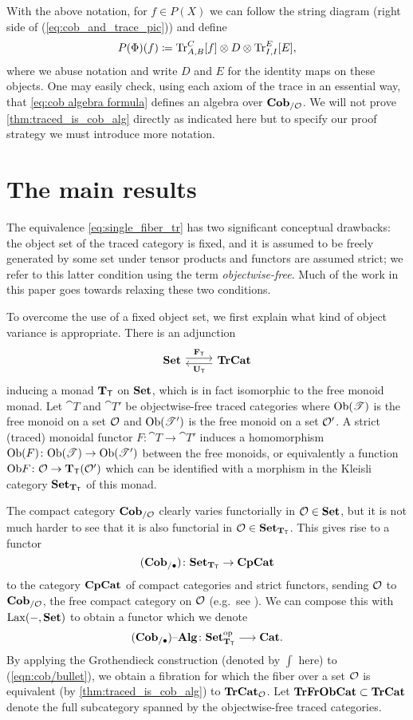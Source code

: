 \documentclass[11pt,oneside,article]{memoir}
\begin{document}
With the above notation, for $f\in P(X)$ we can follow the string diagram (right side of
(\ref{eq:cob_and_trace_pic})) and define
\begin{equation}
    \label{eq:cob algebra formula}
  P(\Phi)(f)\coloneqq\operatorname{Tr}_{A,B}^C[f]\otimes D\otimes\operatorname{Tr}^E_{I,I}[E],
\end{equation}
where we abuse notation and write $D$ and $E$ for the identity maps on these objects. One may easily
check, using each axiom of the trace \cite{JoyalStreetVerity} in an essential way, that
\eqref{eq:cob algebra formula} defines an algebra over $\mathbf{Cob}_{/\mathcal{O}}$. We will not prove
\ref{thm:traced_is_cob_alg} directly as indicated here but to specify our proof strategy we must
introduce more notation.

\section{The main results}
  \label{sec:main_results}

The equivalence \eqref{eq:single_fiber_tr} has two significant conceptual drawbacks: the object set
of the traced category is fixed, and it is assumed to be freely generated by some set under tensor
products and functors are assumed strict; we refer to this latter condition using the term
\emph{objectwise-free}. Much of the work in this paper goes towards relaxing these two conditions.

To overcome the use of a fixed object set, we first explain what kind of object variance is
appropriate. There is an adjunction
\[
  \Adjoint{\Set}{\TrCat}{\FT}{\UT}
\]
inducing a monad $\mathbf{T}_{\mathsf{T}}$ on $\mathbf{Set}$, which is in fact isomorphic to the free monoid monad. Let
$\cat{T}$ and $\cat{T}'$ be objectwise-free traced categories where $\mathrm{Ob}(\mathscr{T})$ is the free
monoid on a set $\mathcal{O}$ and $\mathrm{Ob}(\mathscr{T}')$ is the free monoid on a set $\mathcal{O}'$. A strict
(traced) monoidal functor $F\colon \cat{T}\to \cat{T}'$ induces a homomorphism
$\mathrm{Ob}(F)\colon\mathrm{Ob}(\mathscr{T})\to\mathrm{Ob}(\mathscr{T}')$ between the free monoids, or equivalently a function $\mathrm{Ob}
F\colon\mathcal{O}\to\mathbf{T}_{\mathsf{T}}(\mathcal{O}')$ which can be identified with a morphism in the Kleisli category
$\mathbf{Set}_{\mathbf{T}_{\mathsf{T}}}$ of this monad.

The compact category $\mathbf{Cob}_{/\mathcal{O}}$ clearly varies functorially in $\mathcal{O}\in\mathbf{Set}$, but it is not
much harder to see that it is also functorial in $\mathcal{O}\in\mathbf{Set}_{\mathbf{T}_{\mathsf{T}}}$.  This gives rise to a functor
\[
  (\mathbf{Cob}_{/\bullet})\colon\mathbf{Set}_{\mathbf{T}_{\mathsf{T}}}\to\mathbf{CpCat}
\]
to the category $\mathbf{CpCat}$ of compact categories and strict functors, sending $\mathcal{O}$ to
$\mathbf{Cob}_{/\mathcal{O}}$, the free compact category on $\mathcal{O}$ (e.g.\ see \cite{KellyLaplaza,Abramsky2}).
We can compose this with $\operatorname{Lax}(-,\mathbf{Set})$ to obtain a functor which we denote
\begin{equation}
    \label{eqn:cob/bullet}
  (\mathbf{Cob}_{/\bullet}){\text \textendash}\mathbf{Alg}\colon\mathbf{Set}_{\mathbf{T}_{\mathsf{T}}}^{\mathrm{op}}\longrightarrow\mathbf{Cat}.
\end{equation}
By applying the Grothendieck construction (denoted by $\int$ here) to (\ref{eqn:cob/bullet}), we
obtain a fibration for which the fiber over a set $\mathcal{O}$ is equivalent (by
\ref{thm:traced_is_cob_alg}) to $\mathbf{TrCat}_{\mathcal{O}}$. Let $\mathbf{TrFrObCat}\subset\mathbf{TrCat}$ denote the full
subcategory spanned by the objectwise-free traced categories.
\end{document}
